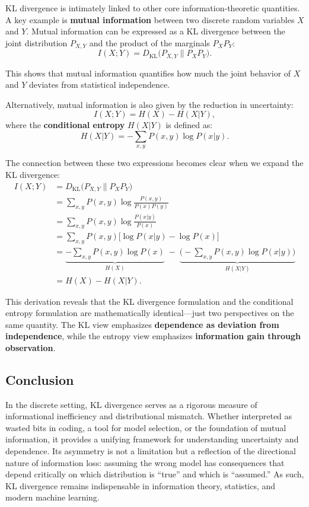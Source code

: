 \documentclass[11pt]{article}
\begin{document}
KL divergence is intimately linked to other core information-theoretic quantities. A key example is \textbf{mutual information} between two discrete random variables \( X \) and \( Y \). Mutual information can be expressed as a KL divergence between the joint distribution \( P_{X,Y} \) and the product of the marginals \( P_X P_Y \):
\[
I(X;Y) = D_{\mathrm{KL}}\big(P_{X,Y} \parallel P_X P_Y\big).
\]

This shows that mutual information quantifies how much the joint behavior of \( X \) and \( Y \) deviates from statistical independence.

Alternatively, mutual information is also given by the reduction in uncertainty:
\[
I(X;Y) = H(X) - H(X|Y),
\]
where the \textbf{conditional entropy} \( H(X|Y) \) is defined as:
\[
H(X|Y) = -\sum_{x,y} P(x,y) \log P(x|y).
\]

The connection between these two expressions becomes clear when we expand the KL divergence:
\begin{align*}
I(X;Y) &= D_{\mathrm{KL}}\big(P_{X,Y} \parallel P_X P_Y\big) \\
&= \sum_{x,y} P(x,y) \log \frac{P(x,y)}{P(x)P(y)} \\
&= \sum_{x,y} P(x,y) \log \frac{P(x|y)}{P(x)} \\
&= \sum_{x,y} P(x,y) \big[ \log P(x|y) - \log P(x) \big] \\
&= \underbrace{-\sum_{x,y} P(x,y) \log P(x)}_{H(X)} \;-\; \underbrace{\big(-\sum_{x,y} P(x,y) \log P(x|y)\big)}_{H(X|Y)} \\
&= H(X) - H(X|Y).
\end{align*}

This derivation reveals that the KL divergence formulation and the conditional entropy formulation are mathematically identical—just two perspectives on the same quantity. The KL view emphasizes \textbf{dependence as deviation from independence}, while the entropy view emphasizes \textbf{information gain through observation}.

\subsection{Conclusion}

In the discrete setting, KL divergence serves as a rigorous measure of informational inefficiency and distributional mismatch. Whether interpreted as wasted bits in coding, a tool for model selection, or the foundation of mutual information, it provides a unifying framework for understanding uncertainty and dependence. Its asymmetry is not a limitation but a reflection of the directional nature of information loss: assuming the wrong model has consequences that depend critically on which distribution is ``true'' and which is ``assumed.'' As such, KL divergence remains indispensable in information theory, statistics, and modern machine learning.
\end{document}
